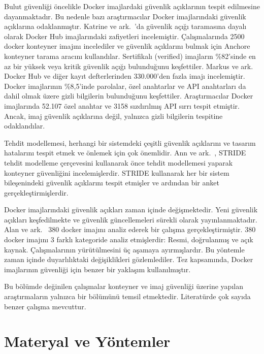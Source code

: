 Bulut güvenliği öncelikle Docker imajlardaki güvenlik açıklarının tespit edilmesine dayanmaktadır. Bu nedenle bazı araştırmacılar Docker imajlarındaki güvenlik açıklarına odaklanmıştır. Katrine ve ark.~\autocite{VulnerabilityAnalysisof2500DockerHubImages}'da güvenlik açığı taramasına dayalı olarak Docker Hub imajlarındaki zafiyetleri incelemiştir. Çalışmalarında 2500 docker konteyner imajını incelediler ve güvenlik açıklarını bulmak için Anchore konteyner tarama aracını kullandılar. Sertifikalı (verified) imajların \%82'sinde en az bir yüksek veya kritik güvenlik açığı bulunduğunu keşfettiler. Markus ve ark.~\autocite{Dahlmanns_2023} Docker Hub ve diğer kayıt defterlerinden 330.000'den fazla imajı incelemiştir. Docker imajlarının \%8,5'inde parolalar, özel anahtarlar ve API anahtarları da dahil olmak üzere gizli bilgilerin bulunduğunu keşfettiler. Araştırmacılar Docker imajlarında 52.107 özel anahtar ve 3158 sızdırılmış API sırrı tespit etmiştir. Ancak, imaj güvenlik açıklarına değil, yalnızca gizli bilgilerin tespitine odaklandılar.

Tehdit modellemesi, herhangi bir sistemdeki çeşitli güvenlik açıklarını ve tasarım hatalarını tespit etmek ve önlemek için çok önemlidir. Ann ve ark.~\autocite{WONG2023103140}, STRIDE tehdit modelleme çerçevesini kullanarak önce tehdit modellemesi yaparak konteyner güvenliğini incelemişlerdir. STRIDE kullanarak her bir sistem bileşenindeki güvenlik açıklarını tespit etmişler ve ardından bir anket gerçekleştirmişlerdir.

Docker imajlarındaki güvenlik açıkları zaman içinde değişmektedir. Yeni güvenlik açıkları keşfedilmekte ve güvenlik güncellemeleri sürekli olarak yayınlanmaktadır. Alan ve ark.~\autocite{Mills2023} 380 docker imajını analiz ederek bir çalışma gerçekleştirmiştir. 380 docker imajını 3 farklı kategoride analiz etmişlerdir: Resmi, doğrulanmış ve açık kaynak. Çalışmalarının yürütülmesini üç aşamaya ayırmışlardır. Bu yöntemle zaman içinde duyarlılıktaki değişiklikleri gözlemlediler. Tez kapsamında, Docker imajlarının güvenliği için benzer bir yaklaşım kullanılmıştır.

Bu bölümde değinilen çalışmalar konteyner ve imaj güvenliği üzerine yapılan  araştırmaların yalnızca bir bölümünü temsil etmektedir. Literatürde çok sayıda benzer çalışma mevcuttur.

\chapter{Materyal ve Yöntemler}\label{ch:methodology}
\vspace{12pt}

